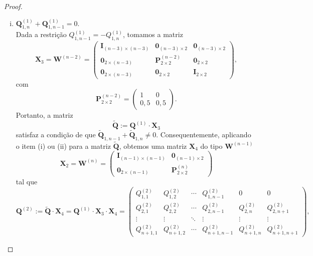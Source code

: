 \documentclass[twoside,openright,titlepage,numbers=noenddot,headinclude,  lineheaders footinclude=true,cleardoublepage=empty,
                                BCOR=5mm,paper=a4,fontsize=12pt ]{scrbook}
\theoremstyle{definition}
\begin{document}
\begin{proof}
\begin{enumerate}[(i)]
\item  $\mathbf{Q}^{(1)}_{1,n} + \mathbf{Q}^{(1)}_{1,n-1} = 0$. 
\hfill \\
Dada a restrição $Q^{(1)}_{1,n-1} = -Q^{(1)}_{1, n} $,
 tomamos a matriz
\[
\mathbf{X}_3 = \mathbf{W}^{(n-2)}=
\begin{pmatrix}
\mathbf{I}_{(n-3)\times (n-3)}& \mathbf{0}_{(n-3) \times 2} &
\mathbf{0}_{(n-3) \times 2} \\
\mathbf{0}_{2 \times (n-3)} & \mathbf{P}^{(n-2)}_{2 \times 2} &
 \mathbf{0}_{2 \times 2}\\
\mathbf{0}_{2 \times (n-3)} & \mathbf{0}_{2 \times 2}
 & \mathbf{I}_{2\times 2}
\end{pmatrix}
,
\]
com
\[
\mathbf{P}^{(n-2)}_{2 \times 2}=
\begin{pmatrix}
1 & 0\\
0,5 & 0,5
\end{pmatrix}
.
\]
Portanto, a matriz
\[
\mathbf{\widetilde{Q}} := \mathbf{Q}^{(1)} \cdot \mathbf{X}_3
\]
satisfaz a condição de que 
$\mathbf{\widetilde{Q}}_{1,n-1} + \mathbf{\widetilde{Q}}_{1,n}
\neq 0$. Consequentemente, aplicando o item (i) ou (ii) para 
a matriz $\mathbf{\widetilde{Q}}$, obtemos uma matriz
$\mathbf{X}_4$ do tipo $\mathbf{W}^{(n-1)}$
\[
\mathbf{X}_2= \mathbf{W}^{(n)} =
\begin{pmatrix}
\mathbf{I}_{(n-1)\times (n-1)}& \mathbf{0}_{(n-1) \times 2} \\
\mathbf{0}_{2 \times (n-1)}   & \mathbf{P}^{(n)}_{2 \times 2}   
\end{pmatrix}
\]
tal que
\[
\mathbf{Q}^{(2)} := \mathbf{\widetilde{Q}} \cdot \mathbf{X}_4 =
\mathbf{Q}^{(1)} \cdot \mathbf{X}_3 \cdot \mathbf{X}_4 =
\begin{pmatrix}
Q^{(2)}_{1,1} & Q^{(2)}_{1,2} & \cdots & Q^{(2)}_{1,n-1} & 0&0\\
Q^{(2)}_{2,1} & Q^{(2)}_{2,2} & \cdots & Q^{(2)}_{2,n-1}&
 Q^{(2)}_{2,n}&
Q^{(2)}_{2,n+1}\\
\vdots & \vdots & \ddots & \vdots & \vdots & \vdots \\
Q^{(2)}_{n+1,1} & Q^{(2)}_{n+1,2} & \cdots & Q^{(2)}_{n+1,n-1}&
 Q^{(2)}_{n+1,n} &
Q^{(2)}_{n+1,n+1}
\end{pmatrix}
,
\]
\end{enumerate}


\end{proof}
\end{document}
